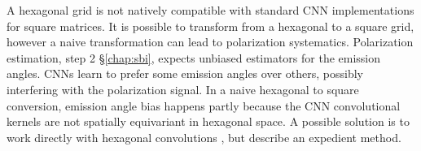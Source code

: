 A hexagonal grid is not natively compatible with standard CNN implementations for square matrices. It is possible to transform from a hexagonal to a square grid, however a naive transformation can lead to polarization systematics. Polarization estimation, step 2 \S\ref{chap:sbi}, expects unbiased estimators for the emission angles. CNNs learn to prefer some emission angles over others, possibly interfering with the polarization signal.
In a naive hexagonal to square conversion, emission angle bias happens partly because the CNN convolutional kernels are not spatially equivariant in hexagonal space. A possible solution is to work directly with hexagonal convolutions \citep{steppa_hexagdly_2019}, but \citet{peirson_deep_2021} describe an expedient method.


